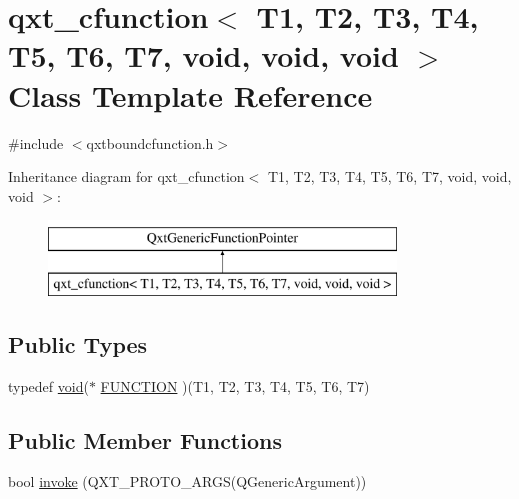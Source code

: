 \hypertarget{classqxt__cfunction_3_01_t1_00_01_t2_00_01_t3_00_01_t4_00_01_t5_00_01_t6_00_01_t7_00_01void_00_01void_00_01void_01_4}{\section{qxt\-\_\-cfunction$<$ T1, T2, T3, T4, T5, T6, T7, void, void, void $>$ Class Template Reference}
\label{classqxt__cfunction_3_01_t1_00_01_t2_00_01_t3_00_01_t4_00_01_t5_00_01_t6_00_01_t7_00_01void_00_01void_00_01void_01_4}
}


{\ttfamily \#include $<$qxtboundcfunction.\-h$>$}

Inheritance diagram for qxt\-\_\-cfunction$<$ T1, T2, T3, T4, T5, T6, T7, void, void, void $>$\-:\begin{figure}[H]
\begin{center}
\leavevmode
\includegraphics[height=2.000000cm]{classqxt__cfunction_3_01_t1_00_01_t2_00_01_t3_00_01_t4_00_01_t5_00_01_t6_00_01_t7_00_01void_00_01void_00_01void_01_4}
\end{center}
\end{figure}
\subsection*{Public Types}
\begin{DoxyCompactItemize}
\item 
typedef \hyperlink{group___u_a_v_objects_plugin_ga444cf2ff3f0ecbe028adce838d373f5c}{void}($\ast$ \hyperlink{classqxt__cfunction_3_01_t1_00_01_t2_00_01_t3_00_01_t4_00_01_t5_00_01_t6_00_01_t7_00_01void_00_01void_00_01void_01_4_aca36e5e5a52651c231f8b4f555806aeb}{F\-U\-N\-C\-T\-I\-O\-N} )(T1, T2, T3, T4, T5, T6, T7)
\end{DoxyCompactItemize}
\subsection*{Public Member Functions}
\begin{DoxyCompactItemize}
\item 
bool \hyperlink{classqxt__cfunction_3_01_t1_00_01_t2_00_01_t3_00_01_t4_00_01_t5_00_01_t6_00_01_t7_00_01void_00_01void_00_01void_01_4_af450b06c163f5f0f08bea333073b00f7}{invoke} (Q\-X\-T\-\_\-\-P\-R\-O\-T\-O\-\_\-A\-R\-G\-S(Q\-Generic\-Argument))
\end{DoxyCompactItemize}
